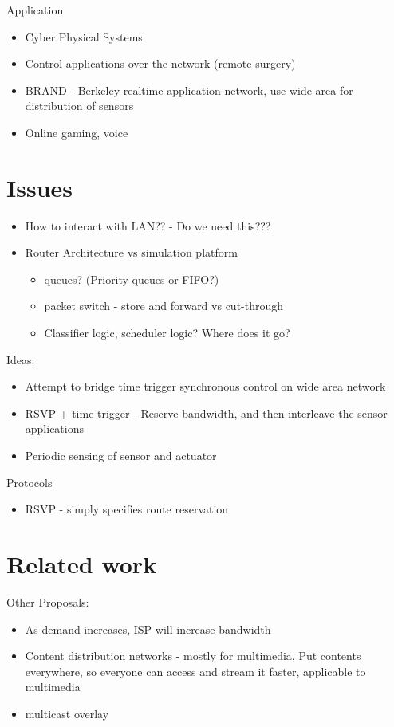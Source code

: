 \documentclass[times, 10pt,twocolumn]{article}
\begin{document}
Application
\begin{itemize}
\item Cyber Physical Systems
\item Control applications over the network (remote surgery)
\item BRAND - Berkeley realtime application network, use wide area for distribution of sensors
\item Online gaming, voice
\end{itemize}

\section{Issues}
\begin{itemize}
\item How to interact with LAN?? - Do we need this???
\item Router Architecture vs simulation platform
\begin{itemize}
\item queues? (Priority queues or FIFO?)
\item packet switch - store and forward vs cut-through
\item Classifier logic, scheduler logic? Where does it go? 
\end{itemize}
 
\end{itemize}


Ideas:
\begin{itemize}
\item Attempt to bridge time trigger synchronous control on wide area network
\item RSVP + time trigger - Reserve bandwidth, and then interleave the sensor applications
\item Periodic sensing of sensor and actuator
\end{itemize}

Protocols
\begin{itemize}
\item RSVP - simply specifies route reservation
\end{itemize}   

\section{Related work}

Other Proposals:
\begin{itemize}
\item As demand increases, ISP will increase bandwidth
\item Content distribution networks - mostly for multimedia, Put contents everywhere, so everyone can access and stream it faster, applicable to multimedia
\item multicast overlay
\end{itemize}
\end{document}
